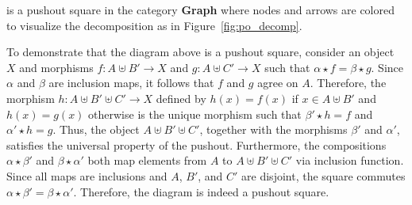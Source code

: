 \begin{example}
\begin{center}
{
    }
\end{center}
     is a pushout square in the category \textbf{Graph} where nodes and arrows are colored to visualize the decomposition as in Figure~\ref{fig:po_decomp}.
\end{example}

To demonstrate that the diagram above is a pushout square, consider an object \( X \) and morphisms \( f: A \uplus B' \mathop{\to} X \) and \( g: A \uplus C' \mathop{\to} X \) such that \( \alpha \mathop{\star} f \mathop{=} \beta \mathop{\star} g \). Since \( \alpha \) and \( \beta \) are inclusion maps, it follows that \( f \) and \( g \) agree on \( A \). Therefore, the morphism \( h: A \uplus B' \uplus C' \mathop{\to} X \) defined by $h(x) \mathop{=} f(x)$ if $x\in A\uplus B'$ and $h(x) \mathop{=} g(x)$ otherwise is the unique morphism such that $\beta' \mathop{\star} h \mathop{=} f$ and $\alpha' \mathop{\star} h \mathop{=} g$. Thus, the object \( A \uplus B' \uplus C' \), together with the morphisms \( \beta' \) and \( \alpha' \), satisfies the universal property of the pushout. Furthermore, the compositions \( \alpha \mathop{\star} \beta'\) and \( \beta \mathop{\star} \alpha'\) both map elements from \( A \) to \( A \uplus B' \uplus C' \) via inclusion function.
Since all maps are inclusions and \( A \), \( B' \), and \( C' \) are disjoint, the square commutes $
     \alpha \mathop{\star} \beta' \mathop{=} \beta \mathop{\star} \alpha'
$. Therefore, the diagram is indeed a pushout square.